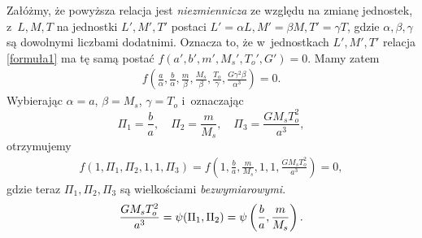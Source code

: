 Załóżmy, że powyższa relacja jest \emph{niezmiennicza} ze względu na zmianę jednostek, z~$L,M,T$ na jednostki $L',M',T'$ postaci 
$L'=\alpha L, M'=\beta M, T'=\gamma T$, gdzie 
$\alpha, \beta, \gamma$ są dowolnymi liczbami dodatnimi. Oznacza to, że w~jednostkach $L',M',T'$ relacja \eqref{formuła1} ma tę samą postać 
$f(a',b',m',M_s', T_o', G')=0$. Mamy zatem
\begin{eqnarray}
 f \left(\frac{a}{\alpha},\frac{b}{\alpha},\frac{m}{\beta},
 \frac{M_s}{\beta},\frac{T_o}{\gamma},\frac{G\gamma^2\beta}{\alpha^3}\right)=0.
\end{eqnarray}
Wybierając $\alpha=a$, $\beta=M_s$, $\gamma=T_o$ i~oznaczając
\[
\Pi_1=\frac{b}{a}, \quad 
\Pi_2=\frac{m}{M_s}, \quad 
\Pi_3=\frac{GM_sT_o^2}{a^3},
\]
otrzymujemy
\begin{eqnarray}\label{rel}
f(1,\Pi_1,\Pi_2, 1,1,\Pi_3) =
f \left(1, \frac{b}{a}, \frac{m}{M_s},1,1,\frac{GM_sT_o^{2}}{a^3}\right)
= 0,
\end{eqnarray}
gdzie teraz $\Pi_1,\Pi_2,\Pi_3$ są wielkościami {\it bezwymiarowymi}.
\begin{equation}\label{invariance1}
   \frac{GM_sT_o^2}{a^3} = \psi(\Pi_1,\Pi_2)=
   \psi\left(\frac{b}{a},\frac{m}{M_s}\right).
\vadjust{\eject}\end{equation}
